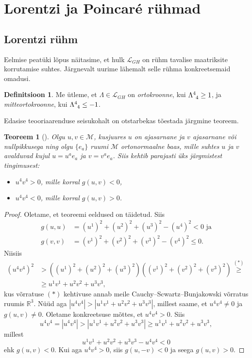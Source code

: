 \documentclass[12pt,a4paper,oneside]{article}
\theoremstyle{plain}
\newtheorem{teoreem}{Teoreem}[section]
\theoremstyle{definition}
\newtheorem{definitsioon}{Definitsioon}[section]
\numberwithin{equation}{section}
\def\R{{\mathbb R}}
\def\L{{\mathcal L}}
\def\M{{\mathcal M}}
\begin{document}
\newpage
\section{Lorentzi ja Poincar\'e rühmad}

\subsection{Lorentzi rühm}

Eelmise peatüki lõpus näitasime, et hulk $\L_{GH}$ on rühm 
tavalise maatriksite korrutamise suhtes. Järgnevalt uurime 
lähemalt selle rühma konkreetsemaid omadusi.

\begin{definitsioon}
Me ütleme, et $\Lambda \in \L_{GH}$ on \emph{ortokroonne}, kui 
$\Lambda\indices{^4_4} \geq 1$, ja \emph{mitteortokroonne}, kui 
$\Lambda\indices{^4_4} \leq -1$.
\end{definitsioon}

Edasise teooriaarenduse seisukohalt on otstarbekas tõestada järgmine 
teoreem.
\begin{teoreem} [\textnormal{\cite[teoreem 1.3.1]{Naber}}] 
\label{teoreem:ajasarnased_vektorid}
Olgu $u, v \in \M$, kusjuures $u$ on ajasarnane ja $v$ ajasarnane 
või nullpikkusega ning olgu $\{e_a\}$ ruumi $\M$ ortonormaalne baas, 
mille suhtes $u$ ja $v$ avalduvad kujul $u = u^a e_a$ ja 
$v = v^a e_a$. Siis kehtib parajasti üks järgmistest tingimusest:
\begin{itemize}
\item[\emph{(a)}] $u^4 v^4 > 0$, mille korral $g\left(u, v\right) < 0$,
\item[\emph{(b)}] $u^4 v^4 < 0$, mille korral $g\left(u, v\right) > 0$.
\end{itemize}
\end{teoreem}
\begin{proof}
Oletame, et teoreemi eeldused on täidetud. Siis
\begin{align*}
g \left(u, u\right) &= \left(u^1\right)^2 + \left(u^2\right)^2 + 
	\left(u^3\right)^2 - \left(u^4\right)^2 < 0 \text{ ja} \\
g \left(v, v\right) &= \left(v^1\right)^2 + \left(v^2\right)^2 + 
	\left(v^3\right)^2 - \left(v^4\right)^2 \leq 0.
\end{align*}
Niisiis
\begin{align*}
\left(u^4 v^4\right)^2 &> \left( \left(u^1\right)^2 + 
\left(u^2\right)^2 + \left(u^3\right)^2 \right) 
\left( \left(v^1\right)^2 + \left(v^2\right)^2 + 
\left(v^3\right)^2 \right) \overset{(*)}{\geq} \\
&\geq u^1 v^1 + u^2 v^2 + u^3 v^3,
\end{align*}
kus võrratuse $(*)$ kehtivuse annab meile Cauchy--Scwartz--Bunjakowski võrratus 
ruumis $\R^3$.
Nüüd aga $|u^4 v^4| > |u^1 v^1 + u^2 v^2 + u^3 v^3|$, millest saame, 
et $u^4 v^4 \neq 0$ ja $g\left (u, v\right ) \neq 0$.
Oletame konkreetsuse mõttes, et $u^4 v^4 > 0$. Siis
\[u^4 v^4 = |u^4 v^4| > |u^1 v^1 + u^2 v^2 + u^3 v^3| 
\geq u^1 v^1 + u^2 v^2 + u^3 v^3,\]
millest
\[u^1 v^1 + u^2 v^2 + u^3 v^3 - u^4 v^4 < 0\]
ehk $g\left (u, v\right ) < 0$.
Kui aga $u^4 v^4 > 0$, siis $g\left (u, -v\right ) < 0$ ja seega 
$g \left (u, v\right ) > 0$.
\end{proof}
\end{document}
